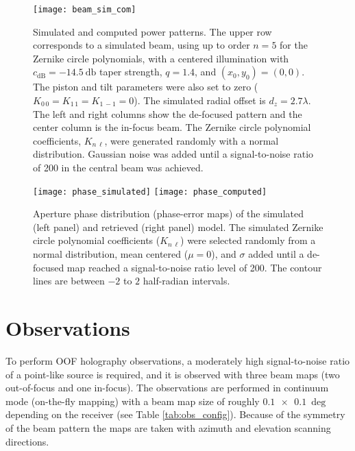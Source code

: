 \documentclass[
    ]
    {aa}
\begin{document}
    \begin{figure*}
        \centering 
        \texttt{[image: beam\_sim\_com]}
        \caption{Simulated and computed power patterns. The upper row corresponds to a simulated beam, using up to order $n=5$ for the Zernike circle polynomials, with a centered illumination with $c_\text{dB}=\SI{-14.5}{\decibel}$ taper strength, $q=1.4$, and $(x_0,y_0)=(0, 0)$. The piston and tilt parameters were also set to zero ($K_{0\,0}=K_{1\,1}=K_{1\,-1}=0$). The simulated radial offset is $d_z=2.7\lambda$.
        The left and right columns show the de-focused pattern and the center column is the in-focus beam.
        The Zernike circle polynomial coefficients, $K_{n\,\ell}$, were generated randomly with a normal distribution. Gaussian noise was added until a signal-to-noise ratio of 200 in the central beam was achieved.}
        \label{fig:beam_sim_com}
    \end{figure*}

    \begin{figure*}
        \centering
        \texttt{[image: phase\_simulated]}
        \texttt{[image: phase\_computed]}
        \caption{Aperture phase distribution (phase-error maps) of the simulated (left panel) and retrieved (right panel) model. The simulated Zernike circle polynomial coefficients ($K_{n\, \ell}$) were selected randomly from a normal distribution, mean centered ($\mu=0$), and $\sigma$ added until a de-focused map reached a signal-to-noise ratio level of \num{200}. The contour lines are between $-2$ to $2$ half-radian intervals.}
        \label{fig:phase_sim_com}
    \end{figure*}

    \section{Observations} \label{sec:observations}
    To perform OOF holography observations, a moderately high signal-to-noise ratio of a point-like source is required, and it is observed with three beam maps (two out-of-focus and one in-focus). The observations are performed in continuum mode (on-the-fly mapping) with a beam map size of roughly $\SI{0.1 x 0.1}{\deg}$ depending on the receiver (see Table \ref{tab:obs_config}). Because of the symmetry of the beam pattern the maps are taken with azimuth and elevation scanning directions.
\end{document}

